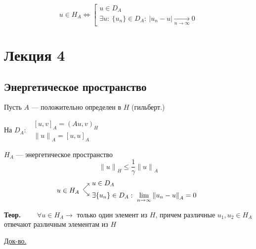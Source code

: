 \documentclass[12pt, a4paper]{article}
\begin{document}
\[ u \in H_A \Leftrightarrow \left[ \begin{array}{l}
	u \in D_A \\
	\exists u : \ \{ u_n \} \in D_A: \ | u_n - u | \underset{n \rightarrow \infty}{\rightarrow} 0
\end{array} \right. \]

\newpage

\section{Лекция 4}

\subsection{Энергетическое пространство}

Пусть $A$ --- положительно определен в $H$ (гильберт.)

На $D_A: \enspace \begin{array}{l}
	{[u, v]}_A = {(A u, v)}_H \\
	{\|u\|}_A = {[u,u]}_A
\end{array} $

$ H_A $ --- энергетическое пространство
\begin{equation}
	{\|u\|}_H \leq \frac{1}{\gamma   } {\|u\|}_A
	\label{4.0}
	\tag{4.0}
\end{equation}
\[ u \in H_A \begin{array}{l@{\ }l}
	\raisebox{-1ex}{$\nearrow$} & u \in D_A \\
	\raisebox{1ex}{$\searrow$} & \exists \{ u_n \} \in D_A: \ \lim\limits_{n \rightarrow \infty} {\|u_n - u\|}_A = 0
\end{array} \]


\textbf{Теор.} $ \qquad \forall u \in H_A \rightarrow $ только один элемент из $H$, причем различные $u_1, u_2 \in H_A$ отвечают различным элементам из $H$

\underline{Док-во.}
\end{document}
